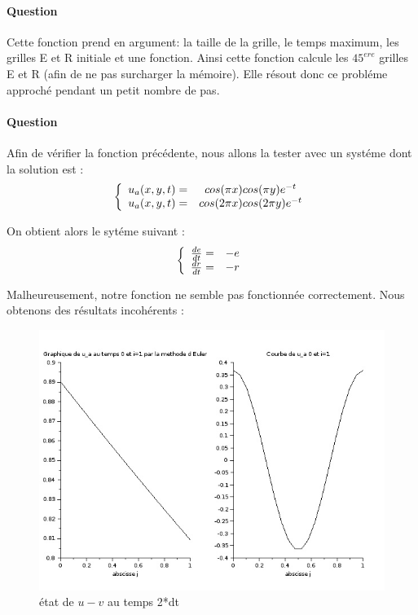 \documentclass[11pt]{article}
\newcounter{question_num}
\begin{document}
	\paragraph{Question  \\}
	Cette fonction prend en argument: la taille de la grille, le temps maximum, les grilles E et R initiale et une fonction. Ainsi cette fonction calcule les $45^{ere}$ grilles E et R (afin de ne pas surcharger la mémoire). Elle résout donc ce probléme approché pendant un petit nombre de pas.
	
	\paragraph{Question  \\}
	Afin de vérifier la fonction précédente, nous allons la tester avec un systéme dont la solution est :
	\[
	\left\{
	\begin {array}{r c l}
	u_a(x,y,t)=& cos(\pi x)cos(\pi y)e^{-t}\\
	u_a(x,y,t)=& cos(2 \pi x)cos(2 \pi y)e^{-t}
	\end {array}
	\right.
	\]
	
	On obtient alors le sytéme suivant :
	\[
	\left\{
	\begin {array}{r c l}
	\frac{de}{dt} =& -e\\
	\frac{dr}{dt} =& -r
	\end {array}
	\right.
	\]
	
	Malheureusement, notre fonction ne semble pas fonctionnée correctement. Nous obtenons des résultats incohérents :
	\begin{figure}[H]
	\begin{center}
		\includegraphics[width=8 cm]{question10.jpeg}
		\caption{ état de $u-{v}$ au temps 2*dt}
	\end{center}
	\end{figure}
	
\end{document}
